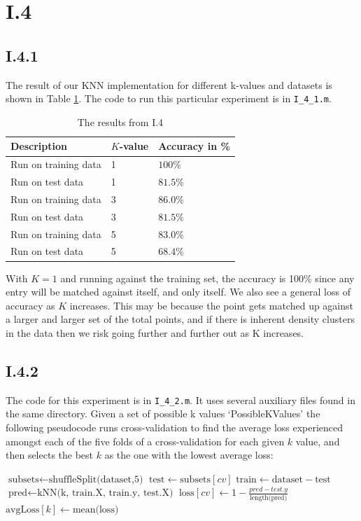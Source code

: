\pagebreak
\section{I.4}
\subsection{I.4.1}
The result of our KNN implementation for different k-values and datasets is
shown in Table \ref{tab:knn-res}. The code to run this particular experiment
is in \texttt{I\_4\_1.m}.
\begin{table}
\center
\begin{tabular}{|l|l|l|}
\hline
Description          & $K$-value & Accuracy in \% \\\hline
Run on training data & 1         & $100  \%$ \\
Run on test data     & 1         & $81.5 \%$ \\
Run on training data & 3         & $86.0 \%$ \\
Run on test data     & 3         & $81.5 \%$ \\
Run on training data & 5         & $83.0 \%$ \\
Run on test data     & 5         & $68.4 \%$ \\\hline
\end{tabular}
\caption{The results from I.4}
\label{tab:knn-res}
\end{table}

With $K=1$ and running against the training set, the accuracy is 100\% since any
entry will be matched against itself, and only itself. We also see a general
loss of accuracy as $K$ increases. This may be because the point gets matched up
against a larger and larger set of the total points, and if there is inherent density
clusters in the data then we risk going further and further out as K increases.

\subsection{I.4.2}
The code for this experiment is in \texttt{I\_4\_2.m}. It uses several auxiliary
files found in the same directory. Given a set of possible k values `PossibleKValues'
the following pseudocode runs cross-validation to find the average loss experienced amongst
each of the five folds of a cross-validation for each given $k$ value, and then selects the
best $k$ as the one with the lowest average loss:

\begin{algorithmic}
		\State $\text{subsets} \gets \text{shuffleSplit(dataset,5)}$
			\State $\text{test} \gets \text{subsets}[cv]$ 
			\State $\text{train} \gets \text{dataset} - \text{test}$ 
			\State $\text{pred} \gets \text{kNN(k, train.X, train.y, test.X)}$
			\State $\text{loss}[cv] \gets 1 - \frac{pred - test.y}{\text{length(pred)}}$
		\EndFor
		\State $\text{avgLoss}[k] \gets \text{mean(loss)}$
	\EndFor
\end{algorithmic}

